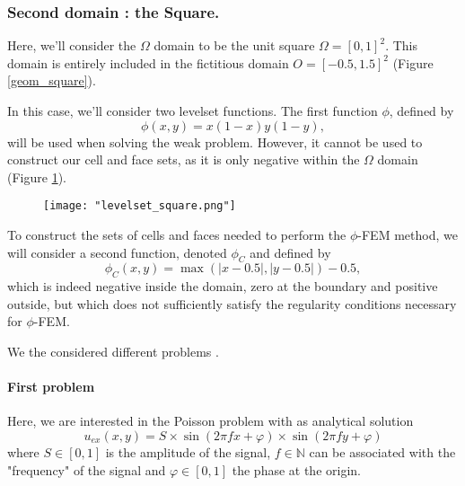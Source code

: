 \subsubsection{Second domain : the Square.} \label{Corr.pb.square}

Here, we'll consider the $\Omega$ domain to be the unit square $\Omega=[0,1]^2$. This domain is entirely included in the fictitious domain $O=[-0.5,1.5]^2$ (Figure \ref{geom_square}).

In this case, we'll consider two levelset functions. The first function $\phi$, defined by
\begin{equation*}
	\phi(x,y)=x(1-x)y(1-y),
\end{equation*}
will be used when solving the weak problem. However, it cannot be used to construct our cell and face sets, as it is only negative within the $\Omega$ domain (Figure \ref{levelset_square}).

\begin{figure}[H]
	\centering
	\texttt{[image: "levelset\_square.png"]}
	\label{levelset_square}
\end{figure} 

To construct the sets of cells and faces needed to perform the $\phi$-FEM method, we will consider a second function, denoted $\phi_C$ and defined by
\begin{equation*}
	\phi_C(x,y)=\max(|x-0.5|,|y-0.5|)-0.5,
\end{equation*}
which is indeed negative inside the domain, zero at the boundary and positive outside, but which does not sufficiently satisfy the regularity conditions necessary for $\phi$-FEM.

We the considered different problems .

\paragraph{First problem} \label{Corr.pb.square.1}

Here, we are interested in the Poisson problem with as analytical solution
\begin{equation*}
	u_{ex}(x,y)=S\times\sin\left(2\pi fx+\varphi\right)\times\sin\left(2\pi fy+\varphi\right)
\end{equation*}
where $S\in[0,1]$ is the amplitude of the signal, $f\in\mathbb{N}$ can be associated with the "frequency" of the signal and $\varphi\in[0,1]$ the phase at the origin.

